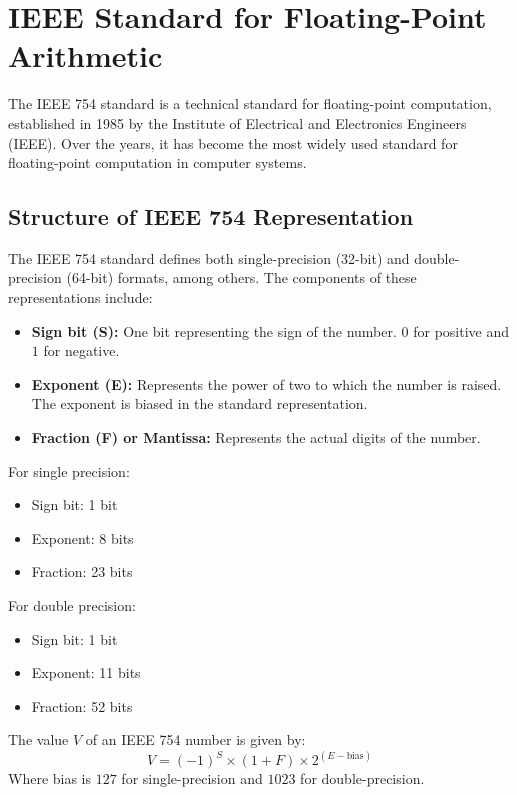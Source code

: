 \section{IEEE Standard for Floating-Point Arithmetic}

The IEEE 754 standard is a technical standard for floating-point computation, established in 1985 by the Institute of Electrical and Electronics Engineers (IEEE). Over the years, it has become the most widely used standard for floating-point computation in computer systems.

\subsection{Structure of IEEE 754 Representation}

The IEEE 754 standard defines both single-precision (32-bit) and double-precision (64-bit) formats, among others. The components of these representations include:

\begin{itemize}
	\item \textbf{Sign bit (S):} One bit representing the sign of the number. \(0\) for positive and \(1\) for negative.
	\item \textbf{Exponent (E):} Represents the power of two to which the number is raised. The exponent is biased in the standard representation.
	\item \textbf{Fraction (F) or Mantissa:} Represents the actual digits of the number.
\end{itemize}

For single precision:
\begin{itemize}
	\item Sign bit: 1 bit
	\item Exponent: 8 bits
	\item Fraction: 23 bits
\end{itemize}

For double precision:
\begin{itemize}
	\item Sign bit: 1 bit
	\item Exponent: 11 bits
	\item Fraction: 52 bits
\end{itemize}

The value \(V\) of an IEEE 754 number is given by:
\begin{equation}
V = (-1)^S \times (1 + F) \times 2^{(E - \text{bias})}
\end{equation}
Where bias is \(127\) for single-precision and \(1023\) for double-precision.

